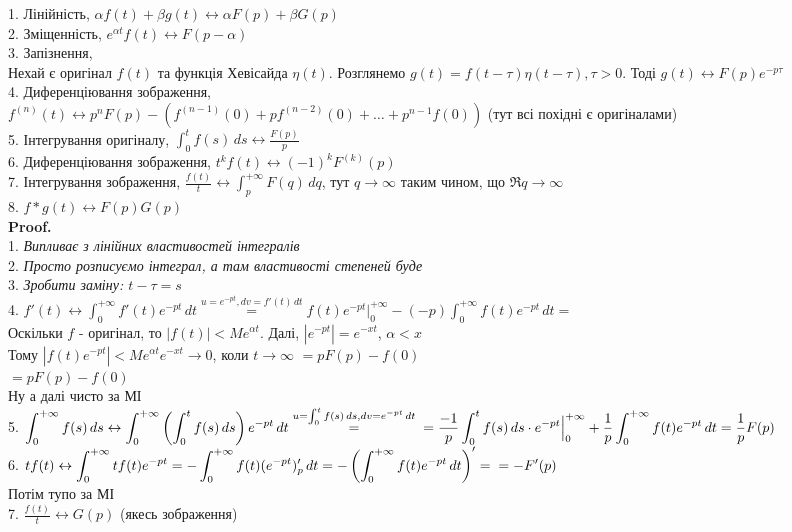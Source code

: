 \documentclass[a4paper, 14pt]{extarticle}
\def\hugespace{\vspace{5mm} \\}
\begin{document}
1. Лінійність, $\alpha f(t) + \beta g(t) \leftrightarrow \alpha F(p) + \beta G(p)$
\hugespace
2. Зміщенність, $e^{\alpha t}f(t) \leftrightarrow F(p-\alpha)$
\hugespace
3. Запізнення,\\
Нехай є оригінал $f(t)$ та функція Хевісайда $\eta(t)$. Розглянемо $g(t) = f(t-\tau) \eta(t-\tau), \tau>0$. Тоді $g(t) \leftrightarrow F(p)e^{-p\tau}$
\hugespace
4. Диференціювання зображення,\\ $f^{(n)}(t) \leftrightarrow p^n F(p) - (f^{(n-1)}(0)+ pf^{(n-2)}(0)+\dots + p^{n-1}f(0))$ (тут всі похідні є оригіналами)
\hugespace
5. Інтегрування оригіналу, $\displaystyle \int_0^t f(s)\,ds \leftrightarrow \frac{F(p)}{p}$
\hugespace
6. Диференціювання зображення, $t^k f(t) \leftrightarrow (-1)^k F^{(k)}(p)$
\hugespace
7. Інтегрування зображення, $\displaystyle \frac{f(t)}{t} \leftrightarrow \int_p^{+\infty} F(q)\,dq$, тут $q \to \infty$ таким чином, що $\Re q \to \infty$
\hugespace
8. $f*g(t) \leftrightarrow F(p) G(p)$\\
\textbf{Proof.}\\
1. \textit{Випливає з лінійних властивостей інтегралів}
\hugespace
2. \textit{Просто розписуємо інтеграл, а там властивості степеней буде}
\hugespace
3. \textit{Зробити заміну: $t - \tau = s$}
\hugespace
4. $f'(t) \leftrightarrow \displaystyle \int_0^{+\infty} f'(t)e^{-pt}\,dt \overset{u=e^{-pt}, dv=f'(t)\,dt}{=} f(t)e^{-pt}\Big|_0^{+\infty} - (-p) \int_0^{+\infty} f(t)e^{-pt}\,dt = $\\
Оскільки $f$ -  оригінал, то $|f(t)| < Me^{\alpha t}$. Далі, $|e^{-pt}| = e^{-xt}$, $\alpha < x$\\
Тому $|f(t)e^{-pt}| < Me^{\alpha t}e^{-xt} \to 0$, коли $t \to \infty$
$= pF(p) - f(0)$\\
$=pF(p)-f(0)$\\
Ну а далі чисто за МІ
\hugespace
5. $\displaystyle \int_0^{+\infty} f(s)\,ds \leftrightarrow \int_0^{+\infty} \left( \int_0^t f(s)\,ds \right) e^{-pt}\,dt \overset{\scriptstyle u = \int_0^t f(s)\,ds, dv = e^{-pt}\,dt}{=} \\ = \frac{-1}{p} \int_0^t f(s)\,ds \cdot e^{-pt} \Big|_0^{+\infty} + \frac{1}{p} \int_0^{+\infty} f(t)e^{-pt}\,dt = \frac{1}{p}F(p)$
\hugespace
6. $t f(t) \leftrightarrow \displaystyle \int_0^{+\infty} tf(t)e^{-pt} = -\int_0^{+\infty} f(t) (e^{-pt})'_p\,dt = - \left(\int_0^{+\infty} f(t)e^{-pt}\,dt \right)' = \\ = -F'(p)$\\
Потім тупо за МІ
\hugespace
7. $\displaystyle \frac{f(t)}{t} \leftrightarrow G(p)$ (якесь зображення)\\
\end{document}

